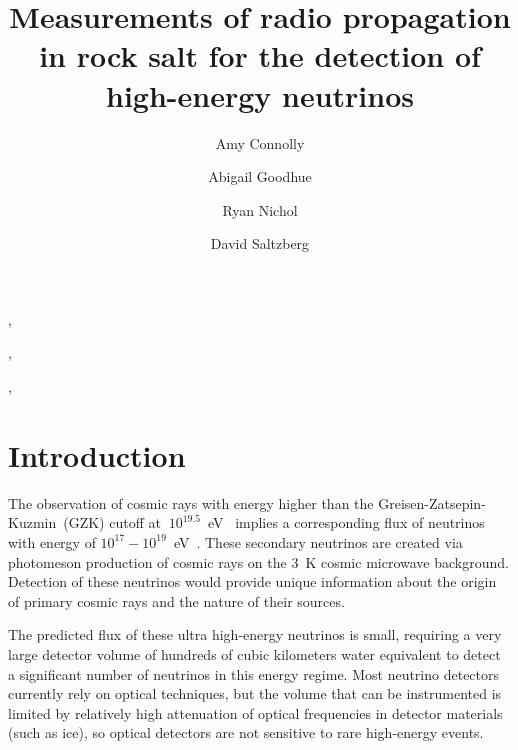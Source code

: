 \documentclass{article}
\begin{document}
    
    \title{Measurements of radio propagation in rock salt for the detection of high-energy neutrinos}
    \author[ucl]{Amy Connolly}, 
    \author[ucla]{Abigail Goodhue}, 
    \author[ucl]{Ryan Nichol}, 
    \author[ucla]{David Saltzberg}
    
    \address[ucl]{University College London}
    \address[ucla]{Department of Physics and Astronomy, UCLA, 475 Portola Plaza, Mailstop 154705, Los Angeles, CA 90095-1547, USA}
      
    \begin{abstract}
    \end{abstract}
    
    \begin{keyword}
      
      \PACS 
    \end{keyword}
\maketitle
  
  \section{Introduction}
  The observation of cosmic rays with energy higher than the Greisen-Zatsepin-Kuzmin~(GZK) 
  cutoff at $~10^{19.5}$~eV~\cite{gzk} implies a corresponding flux of neutrinos 
  with energy of $10^{17}-10^{19}$~eV~\cite{ess}.  These secondary neutrinos 
  are created via photomeson 
  production of cosmic rays on the 3~K cosmic microwave background.  Detection of these neutrinos 
  would provide unique information about the origin of primary cosmic rays and the nature 
  of their sources.
  
  The predicted flux of these 
  ultra high-energy neutrinos is small, requiring a very large detector 
  volume of hundreds of cubic kilometers water equivalent to detect a significant 
  number of neutrinos in this energy regime.  Most neutrino detectors currently rely on 
  optical techniques, but the volume that can be instrumented is limited by relatively high 
  attenuation of optical frequencies in detector materials (such as ice), so 
  optical detectors are not sensitive to rare high-energy events.
  
\end{document}
